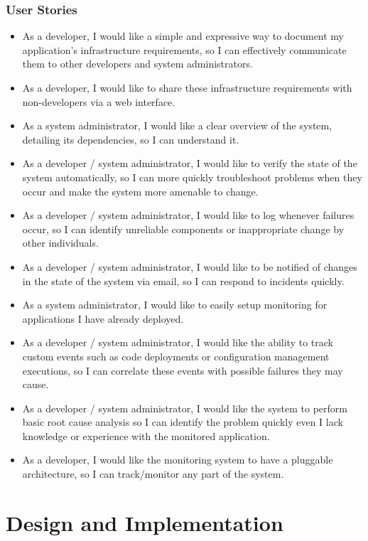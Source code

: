 \documentclass{cshonours}
\begin{document}
\subsection{User Stories}
\begin{itemize}
  \item As a developer, I would like a simple and expressive way to document my application's infrastructure requirements, so I can effectively communicate them to other developers and system administrators.
  \item As a developer, I would like to share these infrastructure requirements with non-developers via a web interface. 
  \item As a system administrator, I would like a clear overview of the system, detailing its dependencies, so I can understand it.
  \item As a developer / system administrator, I would like to verify the state of the system automatically, so I can more quickly troubleshoot problems when they occur and make the system more amenable to change.
  \item As a developer / system administrator, I would like to log whenever failures occur, so I can identify unreliable components or inappropriate change by other individuals. 
  \item As a developer / system administrator, I would like to be notified of changes in the state of the system via email, so I can respond to incidents quickly.
  \item As a system administrator, I would like to easily setup monitoring for applications I have already deployed.
  \item As a developer / system administrator, I would like the ability to track custom events such as code deployments or configuration management executions, so I can correlate these events with possible failures they may cause.
  \item As a developer / system administrator, I would like the system to perform basic root cause analysis so I can identify the problem quickly even I lack knowledge or experience with the monitored application.
  \item As a developer, I would like the monitoring system to have a pluggable architecture, so I can track/monitor any part of the system. 
\end{itemize}

\chapter{Design and Implementation}
\end{document}
